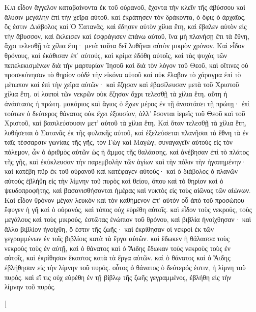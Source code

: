 \begin{pages}
    \begin{Rightside}
        \beginnumbering
		\renewcommand{\LettrineFontHook}{\PHtitl}
		\lettrine[lines=3]{Κ}{αὶ} εἶδον ἄγγελον καταβαίνοντα ἐκ τοῦ οὐρανοῦ, ἔχοντα τὴν κλεῖν τῆς ἀβύσσου καὶ ἅλυσιν μεγάλην ἐπὶ τὴν χεῖρα αὐτοῦ. καὶ ἐκράτησεν τὸν δράκοντα, ὁ ὄφις ὁ ἀρχαῖος, ὅς ἐστιν Διάβολος καὶ Ὁ Σατανᾶς, καὶ ἔδησεν αὐτὸν χίλια ἔτη, καὶ ἔβαλεν αὐτὸν εἰς τὴν ἄβυσσον, καὶ ἔκλεισεν καὶ ἐσφράγισεν ἐπάνω αὐτοῦ, ἵνα μὴ πλανήσῃ ἔτι τὰ ἔθνη, ἄχρι τελεσθῇ τὰ χίλια ἔτη· μετὰ ταῦτα δεῖ λυθῆναι αὐτὸν μικρὸν χρόνον. 
		\pend
		\pstart
		Καὶ εἶδον θρόνους, καὶ ἐκάθισαν ἐπ’ αὐτούς, καὶ κρίμα ἐδόθη αὐτοῖς, καὶ τὰς ψυχὰς τῶν πεπελεκισμένων διὰ τὴν μαρτυρίαν Ἰησοῦ καὶ διὰ τὸν λόγον τοῦ Θεοῦ, καὶ οἵτινες οὐ προσεκύνησαν τὸ θηρίον οὐδὲ τὴν εἰκόνα αὐτοῦ καὶ οὐκ ἔλαβον τὸ χάραγμα ἐπὶ τὸ μέτωπον καὶ ἐπὶ τὴν χεῖρα αὐτῶν· καὶ ἔζησαν καὶ ἐβασίλευσαν μετὰ τοῦ Χριστοῦ χίλια ἔτη. οἱ λοιποὶ τῶν νεκρῶν οὐκ ἔζησαν ἄχρι τελεσθῇ τὰ χίλια ἔτη. αὕτη ἡ ἀνάστασις ἡ πρώτη. μακάριος καὶ ἅγιος ὁ ἔχων μέρος ἐν τῇ ἀναστάσει τῇ πρώτῃ· ἐπὶ τούτων ὁ δεύτερος θάνατος οὐκ ἔχει ἐξουσίαν, ἀλλ’ ἔσονται ἱερεῖς τοῦ Θεοῦ καὶ τοῦ Χριστοῦ, καὶ βασιλεύσουσιν μετ’ αὐτοῦ τὰ χίλια ἔτη. 
		\pend
		\pstart
		Καὶ ὅταν τελεσθῇ τὰ χίλια ἔτη, λυθήσεται ὁ Σατανᾶς ἐκ τῆς φυλακῆς αὐτοῦ, καὶ ἐξελεύσεται πλανῆσαι τὰ ἔθνη τὰ ἐν ταῖς τέσσαρσιν γωνίαις τῆς γῆς, τὸν Γὼγ καὶ Μαγώγ, συναγαγεῖν αὐτοὺς εἰς τὸν πόλεμον, ὧν ὁ ἀριθμὸς αὐτῶν ὡς ἡ ἄμμος τῆς θαλάσσης. καὶ ἀνέβησαν ἐπὶ τὸ πλάτος τῆς γῆς, καὶ ἐκύκλευσαν τὴν παρεμβολὴν τῶν ἁγίων καὶ τὴν πόλιν τὴν ἠγαπημένην· καὶ κατέβη πῦρ ἐκ τοῦ οὐρανοῦ καὶ κατέφαγεν αὐτούς· καὶ ὁ διάβολος ὁ πλανῶν αὐτοὺς ἐβλήθη εἰς τὴν λίμνην τοῦ πυρὸς καὶ θείου, ὅπου καὶ τὸ θηρίον καὶ ὁ ψευδοπροφήτης, καὶ βασανισθήσονται ἡμέρας καὶ νυκτὸς εἰς τοὺς αἰῶνας τῶν αἰώνων. 
		\pend
		\pstart
		Καὶ εἶδον θρόνον μέγαν λευκὸν καὶ τὸν καθήμενον ἐπ’ αὐτόν οὗ ἀπὸ τοῦ προσώπου ἔφυγεν ἡ γῆ καὶ ὁ οὐρανός, καὶ τόπος οὐχ εὑρέθη αὐτοῖς. καὶ εἶδον τοὺς νεκρούς, τοὺς μεγάλους καὶ τοὺς μικρούς, ἑστῶτας ἐνώπιον τοῦ θρόνου, καὶ βιβλία ἠνοίχθησαν· καὶ ἄλλο βιβλίον ἠνοίχθη, ὅ ἐστιν τῆς ζωῆς· καὶ ἐκρίθησαν οἱ νεκροὶ ἐκ τῶν γεγραμμένων ἐν τοῖς βιβλίοις κατὰ τὰ ἔργα αὐτῶν. καὶ ἔδωκεν ἡ θάλασσα τοὺς νεκροὺς τοὺς ἐν αὐτῇ, καὶ ὁ θάνατος καὶ ὁ Ἅιδης ἔδωκαν τοὺς νεκροὺς τοὺς ἐν αὐτοῖς, καὶ ἐκρίθησαν ἕκαστος κατὰ τὰ ἔργα αὐτῶν. καὶ ὁ θάνατος καὶ ὁ Ἅιδης ἐβλήθησαν εἰς τὴν λίμνην τοῦ πυρός. οὗτος ὁ θάνατος ὁ δεύτερός ἐστιν, ἡ λίμνη τοῦ πυρός. καὶ εἴ τις οὐχ εὑρέθη ἐν τῇ βίβλῳ τῆς ζωῆς γεγραμμένος, ἐβλήθη εἰς τὴν λίμνην τοῦ πυρός.
		\pend
        \endnumbering
    \end{Rightside}
    \begin{Leftside}
        \beginnumbering
        \pstart[

\end{Leftside}
\end{pages}
